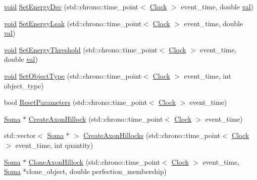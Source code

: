 \begin{DoxyCompactItemize}
\item 
\mbox{\hyperlink{glad_8h_a950fc91edb4504f62f1c577bf4727c29}{void}} \mbox{\hyperlink{class_soma_a37081f7a8fc7832f8e89629221ddb8a6}{Set\+Energy\+Dec}} (std\+::chrono\+::time\+\_\+point$<$ \mbox{\hyperlink{universe_8h_a0ef8d951d1ca5ab3cfaf7ab4c7a6fd80}{Clock}} $>$ event\+\_\+time, double \mbox{\hyperlink{glad_8h_a26942fd2ed566ef553eae82d2c109c8f}{val}})
\item 
\mbox{\hyperlink{glad_8h_a950fc91edb4504f62f1c577bf4727c29}{void}} \mbox{\hyperlink{class_soma_abca59a00940ca2d9c005a84b6785c12f}{Set\+Energy\+Leak}} (std\+::chrono\+::time\+\_\+point$<$ \mbox{\hyperlink{universe_8h_a0ef8d951d1ca5ab3cfaf7ab4c7a6fd80}{Clock}} $>$ event\+\_\+time, double \mbox{\hyperlink{glad_8h_a26942fd2ed566ef553eae82d2c109c8f}{val}})
\item 
\mbox{\hyperlink{glad_8h_a950fc91edb4504f62f1c577bf4727c29}{void}} \mbox{\hyperlink{class_soma_ae2876b37909f37e8922ce364eb06491f}{Set\+Energy\+Threshold}} (std\+::chrono\+::time\+\_\+point$<$ \mbox{\hyperlink{universe_8h_a0ef8d951d1ca5ab3cfaf7ab4c7a6fd80}{Clock}} $>$ event\+\_\+time, double \mbox{\hyperlink{glad_8h_a26942fd2ed566ef553eae82d2c109c8f}{val}})
\item 
\mbox{\hyperlink{glad_8h_a950fc91edb4504f62f1c577bf4727c29}{void}} \mbox{\hyperlink{class_soma_a85b4708eb51ab0962a6128b87aff0700}{Set\+Object\+Type}} (std\+::chrono\+::time\+\_\+point$<$ \mbox{\hyperlink{universe_8h_a0ef8d951d1ca5ab3cfaf7ab4c7a6fd80}{Clock}} $>$ event\+\_\+time, int object\+\_\+type)
\item 
bool \mbox{\hyperlink{class_soma_a82f016dc126f7d1053e5eb455d28c44b}{Reset\+Parameters}} (std\+::chrono\+::time\+\_\+point$<$ \mbox{\hyperlink{universe_8h_a0ef8d951d1ca5ab3cfaf7ab4c7a6fd80}{Clock}} $>$ event\+\_\+time)
\item 
\mbox{\hyperlink{class_soma}{Soma}} $\ast$ \mbox{\hyperlink{class_soma_a42289635de3cb326bceeb5358b99c190}{Create\+Axon\+Hillock}} (std\+::chrono\+::time\+\_\+point$<$ \mbox{\hyperlink{universe_8h_a0ef8d951d1ca5ab3cfaf7ab4c7a6fd80}{Clock}} $>$ event\+\_\+time)
\item 
std\+::vector$<$ \mbox{\hyperlink{class_soma}{Soma}} $\ast$ $>$ \mbox{\hyperlink{class_soma_ab059a6d4a7dc41664d6d17794d09b260}{Create\+Axon\+Hillocks}} (std\+::chrono\+::time\+\_\+point$<$ \mbox{\hyperlink{universe_8h_a0ef8d951d1ca5ab3cfaf7ab4c7a6fd80}{Clock}} $>$ event\+\_\+time, int quantity)
\item 
\mbox{\hyperlink{class_soma}{Soma}} $\ast$ \mbox{\hyperlink{class_soma_a31463fba2f535e9c7cb05c8622fe3562}{Clone\+Axon\+Hillock}} (std\+::chrono\+::time\+\_\+point$<$ \mbox{\hyperlink{universe_8h_a0ef8d951d1ca5ab3cfaf7ab4c7a6fd80}{Clock}} $>$ event\+\_\+time, \mbox{\hyperlink{class_soma}{Soma}} $\ast$clone\+\_\+object, double perfection\+\_\+membership)

\end{DoxyCompactItemize}
